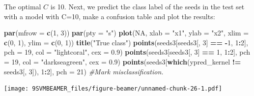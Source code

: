 \documentclass[ignorenonframetext,]{beamer}
\newenvironment{Shaded}{\begin{snugshade}}{\end{snugshade}}
\newcommand{\KeywordTok}[1]{\textcolor[rgb]{0.13,0.29,0.53}{\textbf{#1}}}
\newcommand{\DataTypeTok}[1]{\textcolor[rgb]{0.13,0.29,0.53}{#1}}
\newcommand{\DecValTok}[1]{\textcolor[rgb]{0.00,0.00,0.81}{#1}}
\newcommand{\FloatTok}[1]{\textcolor[rgb]{0.00,0.00,0.81}{#1}}
\newcommand{\StringTok}[1]{\textcolor[rgb]{0.31,0.60,0.02}{#1}}
\newcommand{\CommentTok}[1]{\textcolor[rgb]{0.56,0.35,0.01}{\textit{#1}}}
\newcommand{\OtherTok}[1]{\textcolor[rgb]{0.56,0.35,0.01}{#1}}
\newcommand{\OperatorTok}[1]{\textcolor[rgb]{0.81,0.36,0.00}{\textbf{#1}}}
\newcommand{\NormalTok}[1]{#1}
\begin{document}
\begin{frame}[fragile]

The optimal \(C\) is 10. Next, we predict the class label of the seeds
in the test set with a model with C=10, make a confusion table and plot
the results:

\begin{Shaded}
\end{Shaded}

\end{frame}

\begin{frame}[fragile]

\begin{Shaded}
\begin{Highlighting}[]
\KeywordTok{par}\NormalTok{(}\DataTypeTok{mfrow =} \KeywordTok{c}\NormalTok{(}\DecValTok{1}\NormalTok{, }\DecValTok{3}\NormalTok{))}
\KeywordTok{par}\NormalTok{(}\DataTypeTok{pty =} \StringTok{"s"}\NormalTok{)}
\KeywordTok{plot}\NormalTok{(}\OtherTok{NA}\NormalTok{, }\DataTypeTok{xlab =} \StringTok{"x1"}\NormalTok{, }\DataTypeTok{ylab =} \StringTok{"x2"}\NormalTok{, }\DataTypeTok{xlim =} \KeywordTok{c}\NormalTok{(}\DecValTok{0}\NormalTok{, }\DecValTok{1}\NormalTok{), }\DataTypeTok{ylim =} \KeywordTok{c}\NormalTok{(}\DecValTok{0}\NormalTok{, }\DecValTok{1}\NormalTok{))}
\KeywordTok{title}\NormalTok{(}\StringTok{"True class"}\NormalTok{)}
\KeywordTok{points}\NormalTok{(seeds3[seeds3[, }\DecValTok{3}\NormalTok{] }\OperatorTok{==}\StringTok{ }\OperatorTok{-}\DecValTok{1}\NormalTok{, }\DecValTok{1}\OperatorTok{:}\DecValTok{2}\NormalTok{], }\DataTypeTok{pch =} \DecValTok{19}\NormalTok{, }\DataTypeTok{col =} \StringTok{"lightcoral"}\NormalTok{, }
    \DataTypeTok{cex =} \FloatTok{0.9}\NormalTok{)}
\KeywordTok{points}\NormalTok{(seeds3[seeds3[, }\DecValTok{3}\NormalTok{] }\OperatorTok{==}\StringTok{ }\DecValTok{1}\NormalTok{, }\DecValTok{1}\OperatorTok{:}\DecValTok{2}\NormalTok{], }\DataTypeTok{pch =} \DecValTok{19}\NormalTok{, }\DataTypeTok{col =} \StringTok{"darkseagreen"}\NormalTok{, }
    \DataTypeTok{cex =} \FloatTok{0.9}\NormalTok{)}
\KeywordTok{points}\NormalTok{(seeds3[}\KeywordTok{which}\NormalTok{(ypred_kernel }\OperatorTok{!=}\StringTok{ }\NormalTok{seeds3[, }\DecValTok{3}\NormalTok{]), }\DecValTok{1}\OperatorTok{:}\DecValTok{2}\NormalTok{], }\DataTypeTok{pch =} \DecValTok{21}\NormalTok{)  }\CommentTok{#Mark misclassification.}
\end{Highlighting}
\end{Shaded}

\texttt{[image: 9SVMBEAMER\_files/figure-beamer/unnamed-chunk-26-1.pdf]}

\end{frame}
\end{document}
